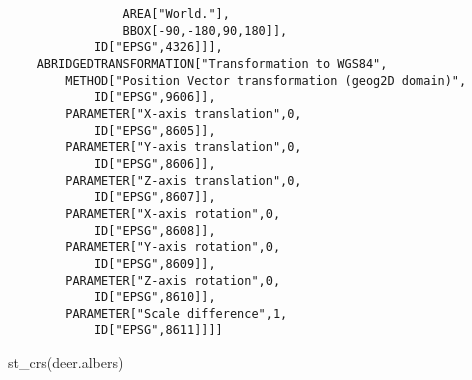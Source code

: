 \documentclass[
  letterpaper,
]{book}
\newenvironment{Shaded}{\begin{snugshade}}{\end{snugshade}}
\newcommand{\FunctionTok}[1]{\textcolor[rgb]{0.28,0.35,0.67}{#1}}
\newcommand{\NormalTok}[1]{\textcolor[rgb]{0.00,0.23,0.31}{#1}}
\begin{document}
\begin{verbatim}
                AREA["World."],
                BBOX[-90,-180,90,180]],
            ID["EPSG",4326]]],
    ABRIDGEDTRANSFORMATION["Transformation to WGS84",
        METHOD["Position Vector transformation (geog2D domain)",
            ID["EPSG",9606]],
        PARAMETER["X-axis translation",0,
            ID["EPSG",8605]],
        PARAMETER["Y-axis translation",0,
            ID["EPSG",8606]],
        PARAMETER["Z-axis translation",0,
            ID["EPSG",8607]],
        PARAMETER["X-axis rotation",0,
            ID["EPSG",8608]],
        PARAMETER["Y-axis rotation",0,
            ID["EPSG",8609]],
        PARAMETER["Z-axis rotation",0,
            ID["EPSG",8610]],
        PARAMETER["Scale difference",1,
            ID["EPSG",8611]]]]
\end{verbatim}

\begin{Shaded}
\begin{Highlighting}[]
\FunctionTok{st\_crs}\NormalTok{(deer.albers)}
\end{Highlighting}
\end{Shaded}
\end{document}
